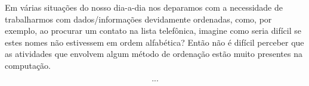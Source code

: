 \qquad Em várias situações do nosso dia-a-dia nos deparamos com a
necessidade de trabalharmos com dados/informações devidamente
ordenadas, como, por exemplo, ao procurar um contato na lista
telefônica, imagine como seria difícil se estes nomes não estivessem
em ordem alfabética? Então não é difícil perceber que as atividades
que envolvem algum método de ordenação estão muito presentes na
computação.

\[...\]